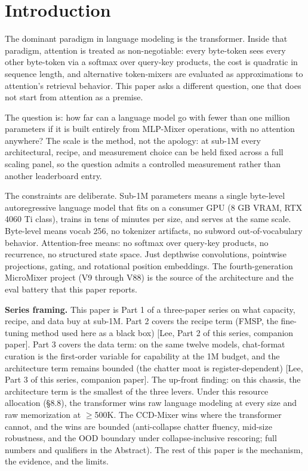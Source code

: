 \documentclass[11pt]{article}
\begin{document}
\section{Introduction}

The dominant paradigm in language modeling is the transformer. Inside that paradigm, attention is treated as non-negotiable: every byte-token sees every other byte-token via a softmax over query-key products, the cost is quadratic in sequence length, and alternative token-mixers are evaluated as approximations to attention's retrieval behavior. This paper asks a different question, one that does not start from attention as a premise.

The question is: how far can a language model go with fewer than one million parameters if it is built entirely from MLP-Mixer operations, with no attention anywhere? The scale is the method, not the apology: at sub-1M every architectural, recipe, and measurement choice can be held fixed across a full scaling panel, so the question admits a controlled measurement rather than another leaderboard entry.

The constraints are deliberate. Sub-1M parameters means a single byte-level autoregressive language model that fits on a consumer GPU (8 GB VRAM, RTX 4060 Ti class), trains in tens of minutes per size, and serves at the same scale. Byte-level means vocab 256, no tokenizer artifacts, no subword out-of-vocabulary behavior. Attention-free means: no softmax over query-key products, no recurrence, no structured state space. Just depthwise convolutions, pointwise projections, gating, and rotational position embeddings. The fourth-generation MicroMixer project (V9 through V88) is the source of the architecture and the eval battery that this paper reports.

\textbf{Series framing.} This paper is Part 1 of a three-paper series on what capacity, recipe, and data buy at sub-1M. Part 2 covers the recipe term (FMSP, the fine-tuning method used here as a black box) [Lee, Part 2 of this series, companion paper]. Part 3 covers the data term: on the same twelve models, chat-format curation is the first-order variable for capability at the 1M budget, and the architecture term remains bounded (the chatter moat is register-dependent) [Lee, Part 3 of this series, companion paper]. The up-front finding: on this chassis, the architecture term is the smallest of the three levers. Under this resource allocation (\S8.8), the transformer wins raw language modeling at every size and raw memorization at $\geq$500K. The CCD-Mixer wins where the transformer cannot, and the wins are bounded (anti-collapse chatter fluency, mid-size robustness, and the OOD boundary under collapse-inclusive rescoring; full numbers and qualifiers in the Abstract). The rest of this paper is the mechanism, the evidence, and the limits.
\end{document}
